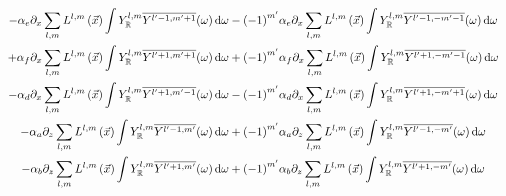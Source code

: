 \documentclass[10pt]{scrartcl}
\begin{document}
\begin{align}
\\
-\alpha_e\partial_x\sum_{l,m}L^{l,m}\left (\vec{x}\right)\int{Y_{\mathbb{R}}^{l,m}\overline{Y^{l'-1, m'+1}}(\omega )\,\mathrm{d}\omega}
-\left({-1}\right)^{m'}&\alpha_e\partial_x\sum_{l,m}L^{l,m}\left (\vec{x}\right)\int{Y_{\mathbb{R}}^{l,m}\overline{Y^{l'-1, -m'-1}}(\omega )\,\mathrm{d}\omega}
\\
+\alpha_f\partial_x\sum_{l,m}L^{l,m}\left (\vec{x}\right)\int{Y_{\mathbb{R}}^{l,m}\overline{Y^{l'+1, m'+1}}(\omega )\,\mathrm{d}\omega}
+\left({-1}\right)^{m'}&\alpha_f\partial_x\sum_{l,m}L^{l,m}\left (\vec{x}\right)\int{Y_{\mathbb{R}}^{l,m}\overline{Y^{l'+1, -m'-1}}(\omega )\,\mathrm{d}\omega}
\\
-\alpha_d\partial_x\sum_{l,m}L^{l,m}\left (\vec{x}\right)\int{Y_{\mathbb{R}}^{l,m}\overline{Y^{l'+1, m'-1}}(\omega )\,\mathrm{d}\omega}
-\left({-1}\right)^{m'}&\alpha_d\partial_x\sum_{l,m}L^{l,m}\left (\vec{x}\right)\int{Y_{\mathbb{R}}^{l,m}\overline{Y^{l'+1, -m'+1}}(\omega )\,\mathrm{d}\omega}
\\
-\alpha_a\partial_z\sum_{l,m}L^{l,m}\left (\vec{x}\right)\int{Y_{\mathbb{R}}^{l,m}\overline{Y^{l'-1, m'}}(\omega )\,\mathrm{d}\omega}
+\left({-1}\right)^{m'}&\alpha_a\partial_z\sum_{l,m}L^{l,m}\left (\vec{x}\right)\int{Y_{\mathbb{R}}^{l,m}\overline{Y^{l'-1, -m'}}(\omega )\,\mathrm{d}\omega}
\\
-\alpha_b\partial_z\sum_{l,m}L^{l,m}\left (\vec{x}\right)\int{Y_{\mathbb{R}}^{l,m}\overline{Y^{l'+1, m'}}(\omega )\,\mathrm{d}\omega}
+\left({-1}\right)^{m'}&\alpha_b\partial_z\sum_{l,m}L^{l,m}\left (\vec{x}\right)\int{Y_{\mathbb{R}}^{l,m}\overline{Y^{l'+1, -m'}}(\omega )\,\mathrm{d}\omega}
\end{align}
\end{document}
